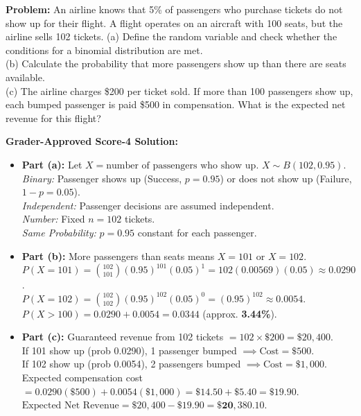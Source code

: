 \begin{workbookbox}
\textbf{Problem:} An airline knows that 5\% of passengers who purchase tickets do not show up for their flight. A flight operates on an aircraft with 100 seats, but the airline sells 102 tickets.
(a) Define the random variable and check whether the conditions for a binomial distribution are met.\\
(b) Calculate the probability that more passengers show up than there are seats available.\\
(c) The airline charges \$200 per ticket sold. If more than 100 passengers show up, each bumped passenger is paid \$500 in compensation. What is the expected net revenue for this flight?

\textbf{Grader-Approved Score-4 Solution:}
\begin{itemize}[leftmargin=1.2em]
  \item \textbf{Part (a):} Let $X = \text{number of passengers who show up}$. $X \sim B(102, 0.95)$.\\
  \textit{Binary:} Passenger shows up (Success, $p=0.95$) or does not show up (Failure, $1-p=0.05$).\\
  \textit{Independent:} Passenger decisions are assumed independent.\\
  \textit{Number:} Fixed $n = 102$ tickets.\\
  \textit{Same Probability:} $p = 0.95$ constant for each passenger.
  \item \textbf{Part (b):} More passengers than seats means $X = 101$ or $X = 102$.\\
  $P(X = 101) = \binom{102}{101} (0.95)^{101} (0.05)^1 = 102(0.00569)(0.05) \approx 0.0290$.\\
  $P(X = 102) = \binom{102}{102} (0.95)^{102} (0.05)^0 = (0.95)^{102} \approx 0.0054$.\\
  $P(X > 100) = 0.0290 + 0.0054 = \mathbf{0.0344}$ (approx. \textbf{3.44\%}).
  \item \textbf{Part (c):} Guaranteed revenue from 102 tickets $= 102 \times \$200 = \$20,400$.\\
  If 101 show up (prob 0.0290), 1 passenger bumped $\implies \text{Cost} = \$500$.\\
  If 102 show up (prob 0.0054), 2 passengers bumped $\implies \text{Cost} = \$1,000$.\\
  Expected compensation cost $= 0.0290(\$500) + 0.0054(\$1,000) = \$14.50 + \$5.40 = \$19.90$.\\
  $\text{Expected Net Revenue} = \$20,400 - \$19.90 = \mathbf{\$20,380.10}$.
\end{itemize}
\end{workbookbox}


